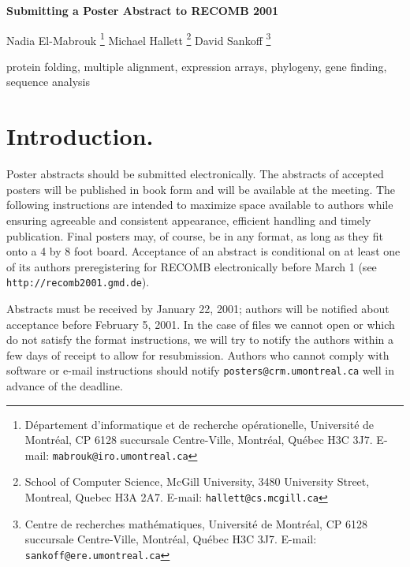 \documentclass[twoside]{article}
\begin{document}
\thispagestyle{headings}
\begin{center}
\Large \bf Submitting  a Poster Abstract to RECOMB 2001\\

\vspace{.5cm}\normalsize 

Nadia El-Mabrouk
\footnote{D\'epartement d'informatique et de recherche op\'erationelle, 
Universit\'e de Montr\'eal, CP 6128 succursale Centre-Ville, Montr\'eal, Qu\'ebec
H3C 3J7. E-mail: {\tt mabrouk@iro.umontreal.ca}} 
Michael Hallett
\footnote{School of Computer Science, McGill University,  3480 University
Street, Montreal, Quebec H3A 2A7.  E-mail: {\tt hallett@cs.mcgill.ca}} David
Sankoff
\footnote{Centre de recherches math\'ematiques,  Universit\'e de Montr\'eal, CP
6128 succursale Centre-Ville, Montr\'eal, Qu\'ebec H3C 3J7. E-mail:
{\tt sankoff@ere.umontreal.ca}} 
\end{center}

\small

\vspace{.3cm}

 protein folding, multiple alignment, expression arrays,
phylogeny, gene finding, sequence analysis

\section{\large Introduction.} Poster abstracts should be submitted 
electronically.  The abstracts of accepted posters will be published in book
form and will be available at the meeting.  The following instructions are
intended to maximize space available to authors while ensuring agreeable and
consistent appearance, efficient handling and timely publication. Final posters
may, of course, be in any format, as long as they fit onto a 4 by 8 foot board. 
Acceptance of an abstract is conditional on at least one of its authors
preregistering for RECOMB electronically before March 1 (see
{\tt http://recomb2001.gmd.de}).

Abstracts must be received by January 22, 2001; authors will be notified about
acceptance before February 5, 2001.  In the case of files we cannot open or
which do not satisfy the format instructions, we will try to notify the authors
within a few days of receipt to allow for resubmission.  Authors who cannot
comply with software or e-mail instructions should notify
{\tt posters@crm.umontreal.ca} well in advance of the deadline.
\end{document}
